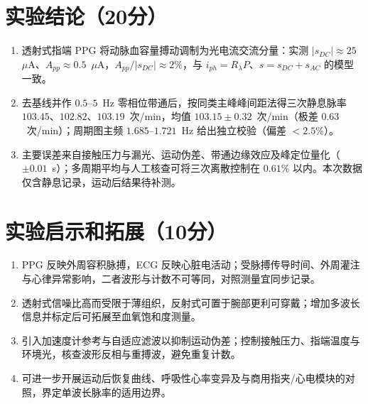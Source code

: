 \documentclass[12pt,a4paper]{ctexart}
\begin{document}
\section*{实验结论（20分）}
\begin{enumerate}
\item 透射式指端 PPG 将动脉血容量搏动调制为光电流交流分量：实测 $|s_{DC}|\approx 25$~$\mu$A、$A_{pp}\approx 0.5$~$\mu$A，$A_{pp}/|s_{DC}|\approx 2\%$，与 $i_{ph}=R_\lambda P$、$s=s_{DC}+s_{AC}$ 的模型一致。
\item 去基线并作 $0.5$--$5$~Hz 零相位带通后，按同类主峰峰间距法得三次静息脉率 $103.45$、$102.82$、$103.19$~次/min，均值 $103.15\pm0.32$~次/min（极差 $0.63$~次/min）；周期图主频 $1.685$--$1.721$~Hz 给出独立校验（偏差 $<2.5\%$）。
\item 主要误差来自接触压力与漏光、运动伪差、带通边缘效应及峰定位量化（$\pm0.01$~s）；多周期平均与人工核查可将三次离散控制在 $0.61\%$ 以内。本次数据仅含静息记录，运动后结果待补测。
\end{enumerate}

\section*{实验启示和拓展（10分）}
\begin{enumerate}
\item PPG 反映外周容积脉搏，ECG 反映心脏电活动；受脉搏传导时间、外周灌注与心律异常影响，二者波形与计数不可等同，对照测量宜同步记录。
\item 透射式信噪比高而受限于薄组织，反射式可置于腕部更利可穿戴；增加多波长信息并标定后可拓展至血氧饱和度测量。
\item 引入加速度计参考与自适应滤波以抑制运动伪差；控制接触压力、指端温度与环境光，核查波形反相与重搏波，避免重复计数。
\item 可进一步开展运动后恢复曲线、呼吸性心率变异及与商用指夹/心电模块的对照，界定单波长脉率的适用边界。
\end{enumerate}
\end{document}
